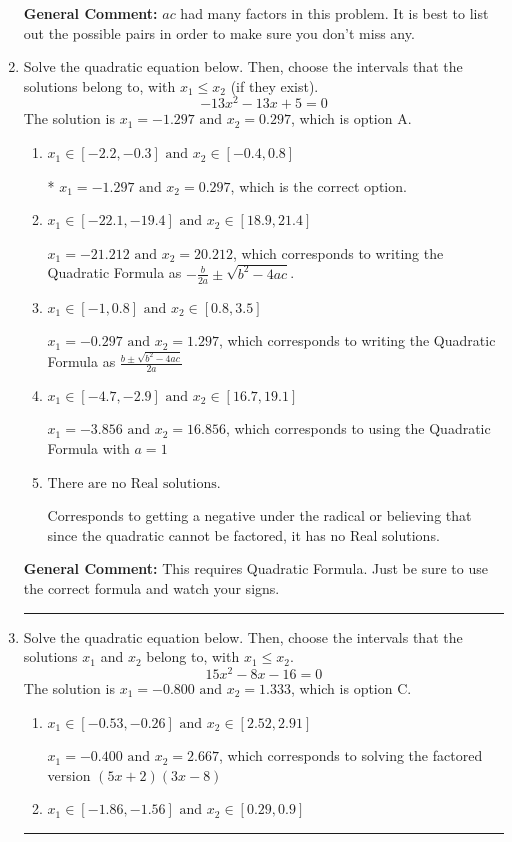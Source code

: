 \documentclass{extbook}[14pt]
\newcommand{\litem}[1]{\item #1

\rule{\textwidth}{0.4pt}}
\begin{document}
\begin{enumerate}
{\textbf{General Comment:} $ac$ had many factors in this problem. It is best to list out the possible pairs in order to make sure you don't miss any.
}
\litem{
Solve the quadratic equation below. Then, choose the intervals that the solutions belong to, with $x_1 \leq x_2$ (if they exist).
\[ -13x^{2} -13 x + 5 = 0 \]The solution is \( x_1 = -1.297 \text{ and } x_2 = 0.297 \), which is option A.\begin{enumerate}[label=\Alph*.]
\item \( x_1 \in [-2.2, -0.3] \text{ and } x_2 \in [-0.4, 0.8] \)

* $x_1 = -1.297 \text{ and } x_2 = 0.297$, which is the correct option.
\item \( x_1 \in [-22.1, -19.4] \text{ and } x_2 \in [18.9, 21.4] \)

 $x_1 = -21.212 \text{ and } x_2 = 20.212$, which corresponds to writing the Quadratic Formula as $-\frac{b}{2a} \pm \sqrt{b^2 - 4ac}$.
\item \( x_1 \in [-1, 0.8] \text{ and } x_2 \in [0.8, 3.5] \)

 $x_1 = -0.297 \text{ and } x_2 = 1.297$, which corresponds to writing the Quadratic Formula as $\frac{b \pm \sqrt{b^2 - 4ac}}{2a}$
\item \( x_1 \in [-4.7, -2.9] \text{ and } x_2 \in [16.7, 19.1] \)

 $x_1 = -3.856 \text{ and } x_2 = 16.856$, which corresponds to using the Quadratic Formula with $a=1$
\item \( \text{There are no Real solutions.} \)

Corresponds to getting a negative under the radical or believing that since the quadratic cannot be factored, it has no Real solutions.
\end{enumerate}

\textbf{General Comment:} This requires Quadratic Formula. Just be sure to use the correct formula and watch your signs.
}
\litem{
Solve the quadratic equation below. Then, choose the intervals that the solutions $x_1$ and $x_2$ belong to, with $x_1 \leq x_2$.
\[ 15x^{2} -8 x -16 = 0 \]The solution is \( x_1 = -0.800 \text{ and } x_2 = 1.333 \), which is option C.\begin{enumerate}[label=\Alph*.]
\item \( x_1 \in [-0.53, -0.26] \text{ and } x_2 \in [2.52, 2.91] \)

$x_1 = -0.400 \text{ and } x_2 = 2.667$, which corresponds to solving the factored version $(5x + 2)(3x -8)$
\item \( x_1 \in [-1.86, -1.56] \text{ and } x_2 \in [0.29, 0.9] \)


\end{enumerate}}
\end{enumerate}
\end{document}
